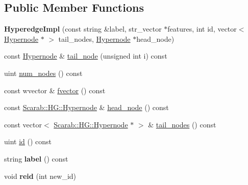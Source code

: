 \subsection*{Public Member Functions}
\begin{DoxyCompactItemize}
\item 
\hypertarget{class_scarab_1_1_h_g_1_1_hyperedge_impl_a3c141efe1be2e8ee78d45caca4711c6e}{
{\bfseries HyperedgeImpl} (const string \&label, str\_\-vector $\ast$features, int id, vector$<$ \hyperlink{class_scarab_1_1_h_g_1_1_hypernode}{Hypernode} $\ast$ $>$ tail\_\-nodes, \hyperlink{class_scarab_1_1_h_g_1_1_hypernode}{Hypernode} $\ast$head\_\-node)}
\label{class_scarab_1_1_h_g_1_1_hyperedge_impl_a3c141efe1be2e8ee78d45caca4711c6e}

\item 
const \hyperlink{class_scarab_1_1_h_g_1_1_hypernode}{Hypernode} \& \hyperlink{class_scarab_1_1_h_g_1_1_hyperedge_impl_a7087ba121f3056eb5946d1909c4b3d58}{tail\_\-node} (unsigned int i) const 
\item 
uint \hyperlink{class_scarab_1_1_h_g_1_1_hyperedge_impl_a9a5bef8789c9c7caee6f53833ea4acc7}{num\_\-nodes} () const 
\item 
const wvector \& \hyperlink{class_scarab_1_1_h_g_1_1_hyperedge_impl_a359446c285164a93995bb87e6ea74882}{fvector} () const 
\item 
const \hyperlink{class_scarab_1_1_h_g_1_1_hypernode}{Scarab::HG::Hypernode} \& \hyperlink{class_scarab_1_1_h_g_1_1_hyperedge_impl_ae194bfc8ecac2a12791fa36c1c2c62a7}{head\_\-node} () const 
\item 
const vector$<$ \hyperlink{class_scarab_1_1_h_g_1_1_hypernode}{Scarab::HG::Hypernode} $\ast$ $>$ \& \hyperlink{class_scarab_1_1_h_g_1_1_hyperedge_impl_a3bf00c8c032397150f59e196aea5e245}{tail\_\-nodes} () const 
\item 
uint \hyperlink{class_scarab_1_1_h_g_1_1_hyperedge_impl_afa81943347267781c25c4e68f7f5f547}{id} () const 
\item 
\hypertarget{class_scarab_1_1_h_g_1_1_hyperedge_impl_a8fe687c9914de37c4d91c353ba669665}{
string {\bfseries label} () const }
\label{class_scarab_1_1_h_g_1_1_hyperedge_impl_a8fe687c9914de37c4d91c353ba669665}

\item 
\hypertarget{class_scarab_1_1_h_g_1_1_hyperedge_impl_a068e4291cbcaa68a59ad64ede34f9edc}{
void {\bfseries reid} (int new\_\-id)}
\label{class_scarab_1_1_h_g_1_1_hyperedge_impl_a068e4291cbcaa68a59ad64ede34f9edc}

\end{DoxyCompactItemize}
